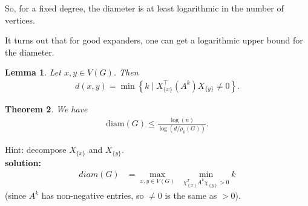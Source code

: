 \documentclass[12pt]{article}%
\newtheorem{theorem}{Theorem}
\newtheorem{lemma}[theorem]{Lemma}
\begin{document}
So, for a fixed degree, the diameter is at least logarithmic in the number
of vertices.

It turns out that for good expanders, one can get a logarithmic upper bound
for the diameter. 

\begin{lemma}
Let $x,y\in V(G)$. Then 
\begin{align}
d(x,y)=\min \left\{ k\mid X_{\{x\}}^{\top }(A^{k})X_{\{y\}}\neq 0\right\} .
\end{align}

\end{lemma}

\begin{theorem}
We have 
\begin{align}
\mathrm{diam}(G)\leq \frac{\log (n)}{\log (d/\rho _{0}(G))}\text{.}
\end{align}

\end{theorem}

Hint: decompose $X_{\{x\}}$ and $X_{\{y\}}$.\\
\textbf{solution:}\\

  \begin{align}
      diam (G) &= \max_{x,y \in V(G)} \ \ \min_{\chi^T_{\left\{ x \right\}} A^k \chi_{\left\{ y \right\}} > 0 } k
  \end{align}
  (since $A^k$ has non-negative entries, so $\neq 0$ 
  is the same as $>0$).
\end{document}
